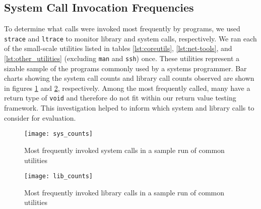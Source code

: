 \subsection{System Call Invocation Frequencies}
To determine what calls were invoked most frequently by programs, we used \texttt{strace} and \texttt{ltrace} to monitor library and system calls, respectively. We ran each of the small-scale utilities listed in tables \ref{lst:coreutils}, \ref{lst:net-tools}, and \ref{lst:other_utilities} (excluding \texttt{man} and \texttt{ssh}) once. These utilities represent a sizable sample of the programs commonly used by a systems programmer. Bar charts showing the system call counts and library call counts observed are shown in figures \ref{fig:sys_counts} and \ref{fig:lib_counts}, respectively. Among the most frequently called, many have a return type of \texttt{void} and therefore do not fit within our return value testing framework. This investigation helped to inform which system and library calls to consider for evaluation.\\
\begin{figure}
\centering
\texttt{[image: sys\_counts]}
\caption{Most frequently invoked system calls in a sample run of common utilities}
\label{fig:sys_counts}
\end{figure}

\begin{figure}
\centering
\texttt{[image: lib\_counts]}
\caption{Most frequently invoked library calls in a sample run of common utilities}
\label{fig:lib_counts}
\end{figure}
